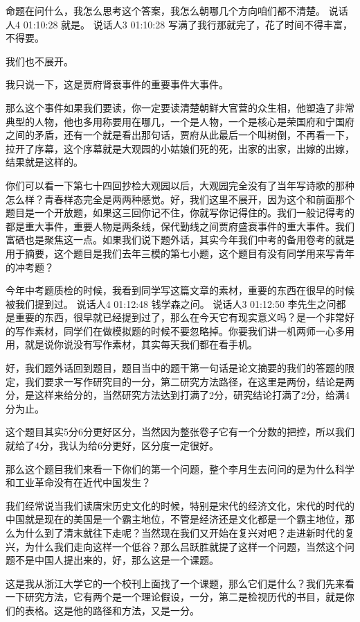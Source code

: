 \documentclass{ctexart}
\renewcommand{\\}{\par}
\begin{document}
命题在问什么，我怎么思考这个答案，我怎么朝哪几个方向咱们都不清楚。
说话人4 01:10:28
就是。
说话人3 01:10:28
写满了我行那就完了，花了时间不得丰富，不得要。

我们也不展开。

我只说一下，这是贾府肾衰事件的重要事件大事件。

那么这个事件如果我们要读，你一定要读清楚朝鲜大官营的众生相，他塑造了非常典型的人物，他也多用称要用在哪几，一个是人物，一个是核心是荣国府和宁国府之间的矛盾，还有一个就是看出那句话，贾府从此最后一个叫树倒，不再看一下，拉开了序幕，这个序幕就是大观园的小姑娘们死的死，出家的出家，出嫁的出嫁，结果就是这样的。

你们可以看一下第七十四回抄检大观园以后，大观园完全没有了当年写诗歌的那种怎么样？青春样态完全是两两种感觉。好，我们这里不展开，因为这个和前面那个题目是一个开放题，如果这三回你记不住，你就写你记得住的。我们一般记得考的都是重大事件，重要人物是两条线，保代勤线之间贾府盛衰事件的重大事件。我们富硒也是聚焦这一点。如果我们说下题外话，其实今年我们中考的备用卷考的就是用于摘要，这个题目是我们去年三模的第七小题，这个题目有没有同学用来写青年的冲考题？

今年中考题质检的时候，我看到同学写这篇文章的素材，重要的东西在很早的时候被我们提到过。
说话人4 01:12:48
钱学森之问。
说话人3 01:12:50
李先生之问都是重要的东西，很早就已经提到过了，那么在今天它有现实意义吗？是一个非常好的写作素材，同学们在做模拟题的时候不要忽略掉。你要我们讲一机两师一心多用用，就是说你说没有写作素材，其实每天我们都在看手机。

好，我们题外话回到题目，题目当中的题干第一句话是论文摘要的我们的答题的限定，我们要求一写作研究目的一分，第二研究方法路径，在这里是两份，结论是两分，是这样来给分的，当然研究方法达到打满了2分，研究结论打满了2分，给满4分为止。

这个题目其实5分6分更好区分，当然因为整张卷子它有一个分数的把控，所以我们就给了4分，我认为给6分更好，区分度一定很好。

那么这个题目我们来看一下你们的第一个问题，整个李月生去问问的是为什么科学和工业革命没有在近代中国发生？

我们经常说当我们读唐宋历史文化的时候，特别是宋代的经济文化，宋代的时代的中国就是现在的美国是一个霸主地位，不管是经济还是文化都是一个霸主地位，那么为什么到了清末就往下走呢？当然现在我们又开始在复兴对吧？走进新时代的复兴，为什么我们走向这样一个低谷？那么吕跃胜就提了这样一个问题，当然这个问题不是中国人提出来的，好，那么这是一个课题。

这是我从浙江大学它的一个校刊上面找了一个课题，那么它们是什么？我们先来看一下研究方法，它有两个是一个理论假设，一分，第二是检视历代的书目，就是你们的表格。这是他的路径和方法，又是一分。
\end{document}
